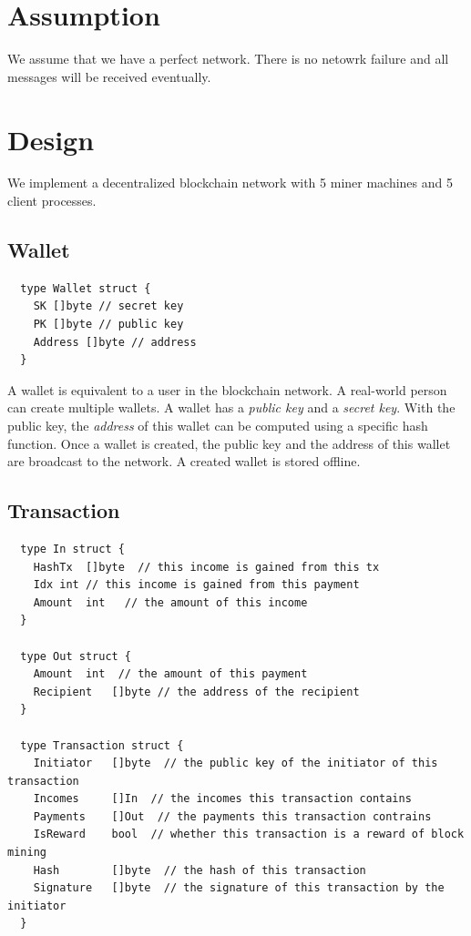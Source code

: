 \documentclass[10pt]{homework}
\begin{document}
\hypersetup{pageanchor=false}
\maketitle
\hypersetup{pageanchor=true}

\section{\textbf{Assumption}}

We assume that we have a perfect network. There is no netowrk failure and all messages will be received eventually.

\section{\textbf{Design}}

We implement a decentralized blockchain network with 5 miner machines and 5 client processes. 

\subsection*{Wallet}


\begin{lstlisting}
  type Wallet struct {
    SK []byte // secret key
    PK []byte // public key
    Address	[]byte // address
  }
\end{lstlisting}

A wallet is equivalent to a user in the blockchain network. A real-world person can create multiple wallets. A wallet has a \textit{public key} and a \textit{secret key}. With the public key, the \textit{address} of this wallet can be computed using a specific hash function. Once a wallet is created, the public key and the address of this wallet are broadcast to the network. A created wallet is stored offline.




\subsection*{Transaction}

\begin{lstlisting}
  type In struct {
    HashTx	[]byte  // this income is gained from this tx
    Idx	int // this income is gained from this payment
    Amount	int   // the amount of this income
  }

  type Out struct {
    Amount	int  // the amount of this payment
    Recipient	[]byte // the address of the recipient
  }

  type Transaction struct {
    Initiator	[]byte  // the public key of the initiator of this transaction
    Incomes		[]In  // the incomes this transaction contains
    Payments	[]Out  // the payments this transaction contrains
    IsReward 	bool  // whether this transaction is a reward of block mining
    Hash		[]byte  // the hash of this transaction
    Signature	[]byte  // the signature of this transaction by the initiator
  }
\end{lstlisting}
\end{document}
